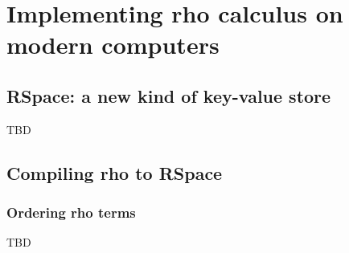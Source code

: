 \section{Implementing rho calculus on modern computers}

\subsection{RSpace: a new kind of key-value store}

TBD

\subsection{Compiling rho to RSpace}

\subsubsection{Ordering rho terms}

TBD
